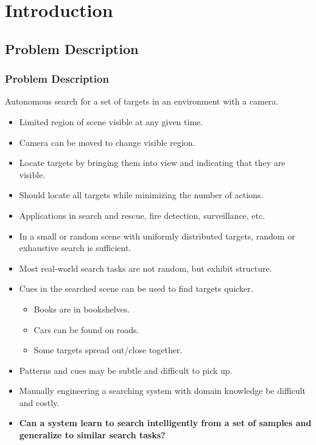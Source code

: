 
\section{Introduction}

\subsection{Problem Description}

\begin{frame}
    \frametitle{Problem Description}
    
    Autonomous search for a set of targets in an environment with a camera.
    
    \begin{itemize}
        \item Limited region of scene visible at any given time. 
        \item Camera can be moved to change visible region.
        \item Locate targets by bringing them into view and indicating that they are visible.
        \item Should locate all targets while minimizing the number of actions.
        \item Applications in search and rescue, fire detection, surveillance, etc.
    \end{itemize}
\end{frame}

\begin{frame}
    \begin{itemize}
        \item In a small or random scene with uniformly distributed targets, random or exhaustive search is sufficient.
        \item Most real-world search tasks are not random, but exhibit structure.
        \item Cues in the searched scene can be used to find targets quicker.
        \begin{itemize}
            \item Books are in bookshelves.
            \item Cars can be found on roads.
            \item Some targets spread out/close together.
        \end{itemize}
        \item Patterns and cues may be subtle and difficult to pick up.
        \item Manually engineering a searching system with domain knowledge be difficult and costly.
        \item \textbf{Can a system learn to search intelligently from a set of samples and generalize to similar search tasks?}
    \end{itemize}
\end{frame}

